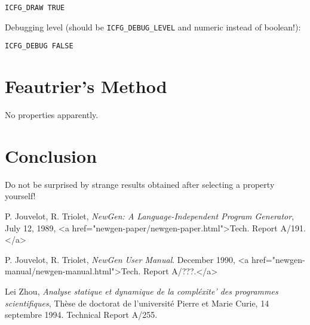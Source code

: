 \begin{verbatim}
ICFG_DRAW TRUE
\end{verbatim}

Debugging level (should be \verb+ICFG_DEBUG_LEVEL+ and numeric instead
of boolean!):

\begin{verbatim}
ICFG_DEBUG FALSE
\end{verbatim}

\section{Feautrier's Method}

No properties apparently.

\section*{Conclusion}

Do not be surprised by strange results obtained after selecting a
property yourself!

\begin{thebibliography}{99}

 P. Jouvelot, R. Triolet, 
{\em NewGen: A Language-Independent Program Generator},
July 12, 1989, 
<a href="newgen-paper/newgen-paper.html">Tech. Report A/191.</a>

 P. Jouvelot, R. Triolet, 
{\em NewGen User Manual}. December
1990, <a href="newgen-manual/newgen-manual.html">Tech. Report A/???.</a>

 Lei Zhou,
{\em Analyse statique et dynamique de la compl\'exite' des programmes
scientifiques}, 
Th\`ese de doctorat de l'universit\'e Pierre et Marie Curie, 14
septembre 1994. Technical Report A/255.

\end{thebibliography}


